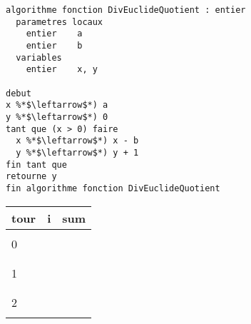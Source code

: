 \documentclass[11pt,a4paper]{article}
\begin{document}
\begin{table}[h!]
  \centering
  \begin{minipage}{0.59\textwidth}
    \centering
\begin{lstlisting}[style=algorithm]
algorithme fonction DivEuclideQuotient : entier
  parametres locaux
    entier    a
    entier    b
  variables
    entier    x, y

debut
x %*$\leftarrow$*) a
y %*$\leftarrow$*) 0
tant que (x > 0) faire
  x %*$\leftarrow$*) x - b
  y %*$\leftarrow$*) y + 1
fin tant que
retourne y
fin algorithme fonction DivEuclideQuotient \end{lstlisting}
  \end{minipage}
  \hfillx
  \begin{minipage}{0.4\textwidth}
    \centering
    \begin{tabular}{|C{1cm}|C{1cm}|C{1cm}|}
        \hline
        tour &  i &  sum  \\
        \hline
             &    &       \\
        0    &    &       \\
             &    &       \\
        \hline
             &    &       \\
        1    &    &       \\
             &    &       \\
        \hline
             &    &       \\
        2    &    &       \\
             &    &       \\

\end{tabular}
\end{minipage}
\end{table}
\end{document}
